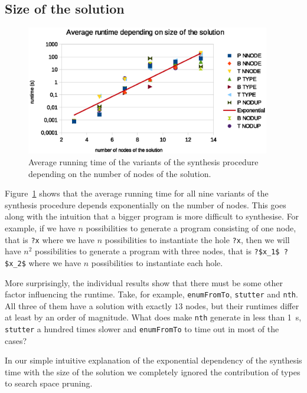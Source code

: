\subsection{Size of the solution}
\begin{figure}[p]
    \centering
    \includegraphics[width=0.95\textwidth]{time_vs_nof_nodes.eps}
    \caption{Average running time of the variants of the synthesis procedure depending on the number of nodes of the solution.}
    \label{fig:runtime_vs_nof_nodes}
\end{figure}
Figure~\ref{fig:runtime_vs_nof_nodes} shows that the average running time for all nine variants of the synthesis procedure depends exponentially on the number of nodes. This goes along with the intuition that a bigger program is more difficult to synthesise.
For example, if we have $n$ possibilities to generate a program consisting of one node, that is \lstinline!?x! where we have $n$ possibilities to instantiate the hole \lstinline!?x!, then we will have $n^2$ possibilities to generate a program with three nodes, that is \lstinline!?$x_1$ ?$x_2$! where we have $n$ possibilities to instantiate each hole.


More surprisingly, the individual results show that there must be some other factor influencing the runtime. Take, for example, \lstinline?enumFromTo?, \lstinline?stutter? and \lstinline?nth?. All three of them have a solution with exactly $13$ nodes, but their runtimes differ at least by an order of magnitude. What does make \lstinline?nth? generate in less than \SI{1}{s}, \lstinline?stutter? a hundred times slower and \lstinline?enumFromTo? to time out in most of the cases?

In our simple intuitive explanation of the exponential dependency of the synthesis time with the size of the solution we completely ignored the contribution of types to search space pruning.

